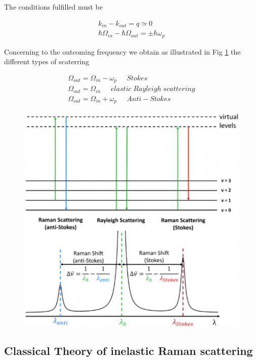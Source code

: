 \documentclass[openany,11pt,a4paper]{report}
\begin{document}
The conditions fulfilled must be 

\begin{equation}
\begin{aligned} k_{in} - k_{out}= q \simeq 0 \\ 
\hbar \Omega _{in} - \hbar \Omega _{out}= \pm \hbar \omega _{p} \end{aligned}
\end{equation}

Concerning to the outcoming frequency we obtain as illustrated in Fig \ref{stokes}  the different types of scaterring



\begin{equation}
\begin{aligned} 
\Omega _{out} =  \Omega _{in} - \omega _{p}  \; \; \; \; \; Stokes  \\ 
  \Omega _{out}= \Omega _{in} \; \; \; \; \; elastic  \;  Rayleigh  \; scattering  \\
 \Omega _{out}=  \Omega _{in} + \omega _{p} \; \; \; \; \; Anti- Stokes 
\end{aligned}
\end{equation}


\begin{figure}[H]
\centering
\includegraphics[scale=1.1]{stoke.PNG}
\caption{\cite{stokesdiagram}}
\label{stokes}
\end{figure}


\subsection{Classical Theory of inelastic Raman scattering}
\end{document}
